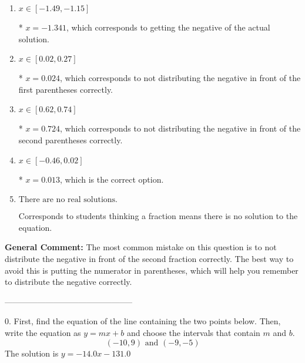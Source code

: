\documentclass{extbook}[14pt]
\begin{document}
\begin{enumerate}[label=\Alph*.] 
\item $ x \in [-1.49, -1.15] $ 

 * $x = -1.341$, which corresponds to getting the negative of the actual solution. 
\item $ x \in [0.02, 0.27] $ 

 * $x = 0.024$, which corresponds to not distributing the negative in front of the first parentheses correctly. 
\item $ x \in [0.62, 0.74] $ 

 * $x = 0.724$, which corresponds to not distributing the negative in front of the second parentheses correctly. 
\item $ x \in [-0.46, 0.02] $ 

 * $x = 0.013$, which is the correct option. 
\item $ \text{There are no real solutions.} $ 

 Corresponds to students thinking a fraction means there is no solution to the equation. 
\end{enumerate} 
 
\textbf{General Comment:} The most common mistake on this question is to not distribute the negative in front of the second fraction correctly. The best way to avoid this is putting the numerator in parentheses, which will help you remember to distribute the negative correctly. 

-----------------------------------------------

0. First, find the equation of the line containing the two points below. Then, write the equation as $ y=mx+b $ and choose the intervals that contain $m$ and $b$.
\[ (-10, 9) \text{ and } (-9, -5) \] 
The solution is $ y = -14.0x -131.0 $ 
\end{document}
